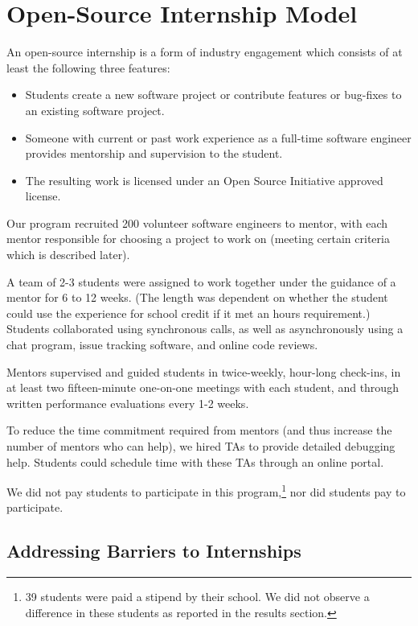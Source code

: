 \section{Open-Source Internship Model}

An open-source internship is a form of industry engagement which consists of at least the following three features:

\begin{itemize}
    \item Students create a new software project or contribute features or bug-fixes to an existing software project.
    \item Someone with current or past work experience as a full-time software engineer provides mentorship and supervision to the student.
    \item The resulting work is licensed under an Open Source Initiative approved license. \cite{OpenSourceDefinition}
\end{itemize}

Our program recruited 200 volunteer software engineers to mentor, with each mentor responsible for choosing a project to work on (meeting certain criteria which is described later).

A team of 2-3 students were assigned to work together under the guidance of a mentor for 6 to 12 weeks. (The length was dependent on whether the student could use the experience for school credit if it met an hours requirement.) Students collaborated using synchronous calls, as well as asynchronously using a chat program, issue tracking software, and online code reviews.

Mentors supervised and guided students in twice-weekly, hour-long check-ins, in at least two fifteen-minute one-on-one meetings with each student, and through written performance evaluations every 1-2 weeks.

To reduce the time commitment required from mentors (and thus increase the number of mentors who can help), we hired TAs to provide detailed debugging help. Students could schedule time with these TAs through an online portal.

We did not pay students to participate in this program,\footnote{39 students were paid a stipend by their school. We did not observe a difference in these students as reported in the results section.} nor did students pay to participate.


\subsection{Addressing Barriers to Internships}

